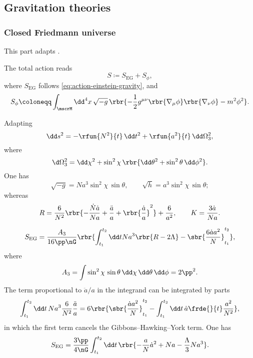 \documentclass[a4paper,11pt]{article}
\begin{document}
\subsection{Gravitation theories}

\subsubsection*{Closed Friedmann universe}
This part adapts \cite[sec.\ 8.1.2]{Kiefer2012}.

The total action reads
\begin{equation}
S \coloneqq S_\text{EG} + S_\phi,
\end{equation}
where $S_\text{EG}$ follows \eqref{eq:action-einstein-gravity}, and
\begin{equation}
S_\phi \coloneqq \int_\mscrM\dd^4 x\, \sqrt{-g}\,
\rbr{-\frac{1}{2} g^{\mu\nu} \rbr{\nabla_\mu\phi} \rbr{\nabla_\nu\phi}
-m^2\phi^2}.
\end{equation}

Adapting
\begin{equation}
\dd s^2 = -\rfun{N^2}{t}\,\dd t^2 + \rfun{a^2}{t}\,\dd\Omega_3^2,
\end{equation}
where
\begin{equation}
\d\Omega_3^2 = \dd\chi^2+\sin^2\chi\,\rbr{\dd\theta^2+\sin^2\theta\,\dd\phi^2}.
\end{equation}
One has
\begin{equation}
\sqrt{-g} = N a^3 \sin^2\chi\,\sin\theta,\qquad
\sqrt{h} = a^3\sin^2\chi\,\sin\theta;
\end{equation}
whereas
\begin{equation}
R = \frac{6}{N^2}\rbr{-\frac{\dot{N}\dot{a}}{Na} + \frac{\ddot{a}}{a} + 
\rbr{\frac{\dot{a}}{a}}^2} + \frac{6}{a^2},\qquad
K = \frac{3\dot{a}}{Na}.
\end{equation}

\begin{equation}
S_\text{EG} = \frac{A_3}{16\pp\nG} \rbr{\int_{t_1}^{t_2} \dd t
Na^3\rbr{R - 2\Lambda} - \sbr{\frac{6\dot{a}a^2}{N}}_{t_1}^{t_2}},
\end{equation}
where
\begin{equation}
A_3 = \int \sin^2\chi\,\sin\theta\,\dd\chi\,\dd\theta\,\dd\phi = 2\pp^2.
\end{equation}
The term proportional to $\ddot{a}/a$ in the integrand can be integrated by
parts
\begin{equation}
\int_{t_1}^{t_2} \dd t\,Na^3 \frac{6}{N^2} \frac{\ddot{a}}{a}
= 6\rbr{\sbr{\frac{\dot{a}a^2}{N}}_{t_1}^{t_2} - \int_{t_1}^{t_2}\dd t
\,\dot{a}\frde{}{t}\frac{a^2}{N^2}},
\end{equation}
in which the first term cancels the Gibbons--Hawking--York term. One has
\begin{equation}
S_\text{EG} = \frac{3\pp}{4\nG}\int_{t_1}^{t_2} \dd t\,
\rbr{-\frac{a}{N}\dot{a}^2 + N a - \frac{\Lambda}{3}N a^3}.
\end{equation}
\end{document}
